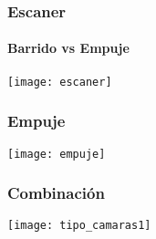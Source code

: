 \documentclass[]{beamer}
\begin{document}
\begin{frame}
\frametitle{Escaner}
\framesubtitle{Barrido vs Empuje}
\begin{center}
\texttt{[image: escaner]}
\end{center}
\end{frame}
\begin{frame}
\frametitle{Empuje}
\begin{center}
\texttt{[image: empuje]}
\end{center}
\end{frame}
\begin{frame}
\frametitle{Combinación}
\begin{center}
\texttt{[image: tipo\_camaras1]}
\end{center}
\end{frame}
\end{document}

